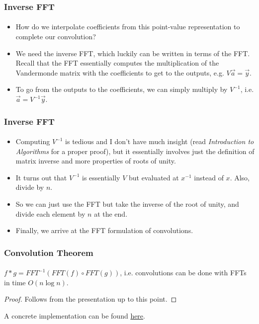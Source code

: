 \documentclass{beamer}                             %
\begin{document}
\begin{frame}
\frametitle{Inverse FFT}
\framesubtitle{}
\begin{itemize}[<+->]
  \item How do we interpolate coefficients from this point-value
    representation to complete our convolution?
  \item We need the inverse FFT, which luckily can be written in
    terms of the FFT. Recall that the FFT essentially computes the
    multiplication of the Vandermonde matrix with the coefficients
    to get to the outputs, e.g. \( V \vec{a} = \vec{y} \).
  \item To go from the outputs to the coefficients, we can simply
    multiply by \( V^{-1} \), i.e. \( \vec{a} = V^{-1} \vec{y} \).
\end{itemize}
\end{frame}

\begin{frame}
\frametitle{Inverse FFT}
\framesubtitle{}
\begin{itemize}[<+->]
  \item Computing \( V^{-1} \) is tedious and I don't have much insight
    (read \textit{Introduction to Algorithms} for a proper proof), but
    it essentially involves just the definition of matrix inverse and
    more properties of roots of unity.
  \item It turns out that \( V^{-1} \) is essentially \( V \) but evaluated
    at \( x^{-1} \) instead of \( x \). Also, divide by \( n \).
  \item So we can just use the FFT but take the inverse of the root of unity,
    and divide each element by \( n \) at the end.
  \item Finally, we arrive at the FFT formulation of convolutions.
\end{itemize}
\end{frame}

\begin{frame}
\frametitle{Convolution Theorem}
\framesubtitle{}
\begin{theorem}
  \( f * g = FFT^{-1}(FFT(f) \circ FFT(g)) \), i.e. convolutions 
  can be done with FFTs in time \( O(n \log n) \).
\end{theorem}
\begin{proof}
Follows from the presentation up to this point.
\end{proof}

A concrete implementation can be found 
\href{https://gist.github.com/stephen-huan/aa609965c86d750736398c28b025f9be\#fast-fourier-transform}{here}.
\end{frame}
\end{document}

